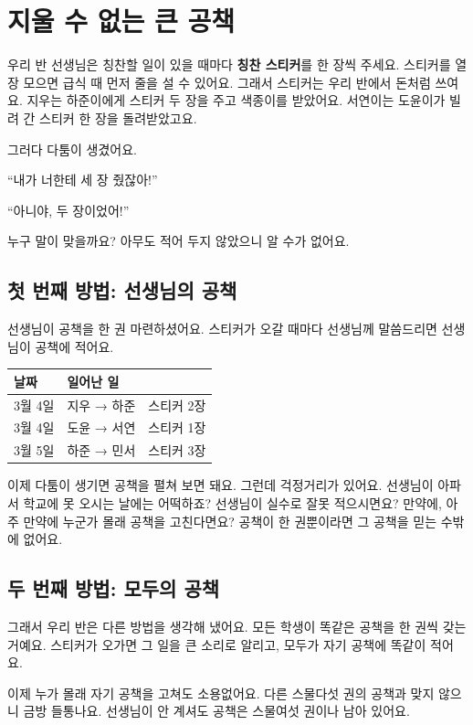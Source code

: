 \chapter{지울 수 없는 큰 공책}

우리 반 선생님은 칭찬할 일이 있을 때마다 \textbf{칭찬 스티커}를 한 장씩 주세요.
스티커를 열 장 모으면 급식 때 먼저 줄을 설 수 있어요.
그래서 스티커는 우리 반에서 돈처럼 쓰여요.
지우는 하준이에게 스티커 두 장을 주고 색종이를 받았어요.
서연이는 도윤이가 빌려 간 스티커 한 장을 돌려받았고요.

그러다 다툼이 생겼어요.

“내가 너한테 세 장 줬잖아!”

“아니야, 두 장이었어!”

누구 말이 맞을까요?
아무도 적어 두지 않았으니 알 수가 없어요.

\section{첫 번째 방법: 선생님의 공책}

선생님이 공책을 한 권 마련하셨어요.
스티커가 오갈 때마다 선생님께 말씀드리면 선생님이 공책에 적어요.

\begin{center}
\small
\begin{tabular}{@{}lll@{}}
\toprule
날짜 & 일어난 일 & \\
\midrule
3월 4일 & 지우 → 하준 & 스티커 2장 \\
3월 4일 & 도윤 → 서연 & 스티커 1장 \\
3월 5일 & 하준 → 민서 & 스티커 3장 \\
\bottomrule
\end{tabular}
\end{center}

이제 다툼이 생기면 공책을 펼쳐 보면 돼요.
그런데 걱정거리가 있어요.
선생님이 아파서 학교에 못 오시는 날에는 어떡하죠?
선생님이 실수로 잘못 적으시면요?
만약에, 아주 만약에 누군가 몰래 공책을 고친다면요?
공책이 한 권뿐이라면 그 공책을 믿는 수밖에 없어요.

\section{두 번째 방법: 모두의 공책}

그래서 우리 반은 다른 방법을 생각해 냈어요.
모든 학생이 똑같은 공책을 한 권씩 갖는 거예요.
스티커가 오가면 그 일을 큰 소리로 알리고, 모두가 자기 공책에 똑같이 적어요.

이제 누가 몰래 자기 공책을 고쳐도 소용없어요.
다른 스물다섯 권의 공책과 맞지 않으니 금방 들통나요.
선생님이 안 계셔도 공책은 스물여섯 권이나 남아 있어요.

